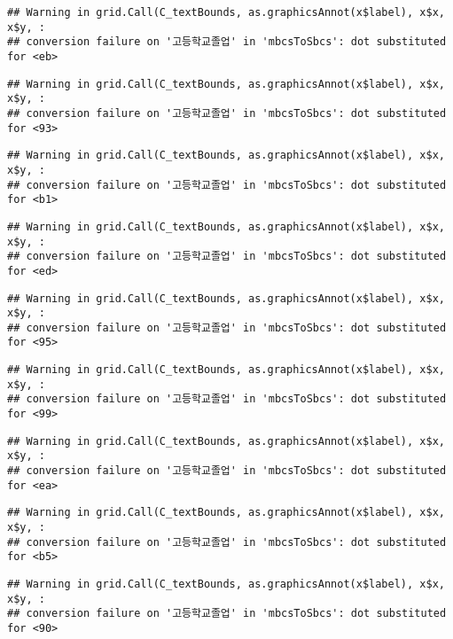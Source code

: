 \documentclass[
]{article}
\begin{document}
\begin{verbatim}
## Warning in grid.Call(C_textBounds, as.graphicsAnnot(x$label), x$x, x$y, :
## conversion failure on '고등학교졸업' in 'mbcsToSbcs': dot substituted for <eb>
\end{verbatim}

\begin{verbatim}
## Warning in grid.Call(C_textBounds, as.graphicsAnnot(x$label), x$x, x$y, :
## conversion failure on '고등학교졸업' in 'mbcsToSbcs': dot substituted for <93>
\end{verbatim}

\begin{verbatim}
## Warning in grid.Call(C_textBounds, as.graphicsAnnot(x$label), x$x, x$y, :
## conversion failure on '고등학교졸업' in 'mbcsToSbcs': dot substituted for <b1>
\end{verbatim}

\begin{verbatim}
## Warning in grid.Call(C_textBounds, as.graphicsAnnot(x$label), x$x, x$y, :
## conversion failure on '고등학교졸업' in 'mbcsToSbcs': dot substituted for <ed>
\end{verbatim}

\begin{verbatim}
## Warning in grid.Call(C_textBounds, as.graphicsAnnot(x$label), x$x, x$y, :
## conversion failure on '고등학교졸업' in 'mbcsToSbcs': dot substituted for <95>
\end{verbatim}

\begin{verbatim}
## Warning in grid.Call(C_textBounds, as.graphicsAnnot(x$label), x$x, x$y, :
## conversion failure on '고등학교졸업' in 'mbcsToSbcs': dot substituted for <99>
\end{verbatim}

\begin{verbatim}
## Warning in grid.Call(C_textBounds, as.graphicsAnnot(x$label), x$x, x$y, :
## conversion failure on '고등학교졸업' in 'mbcsToSbcs': dot substituted for <ea>
\end{verbatim}

\begin{verbatim}
## Warning in grid.Call(C_textBounds, as.graphicsAnnot(x$label), x$x, x$y, :
## conversion failure on '고등학교졸업' in 'mbcsToSbcs': dot substituted for <b5>
\end{verbatim}

\begin{verbatim}
## Warning in grid.Call(C_textBounds, as.graphicsAnnot(x$label), x$x, x$y, :
## conversion failure on '고등학교졸업' in 'mbcsToSbcs': dot substituted for <90>
\end{verbatim}
\end{document}
